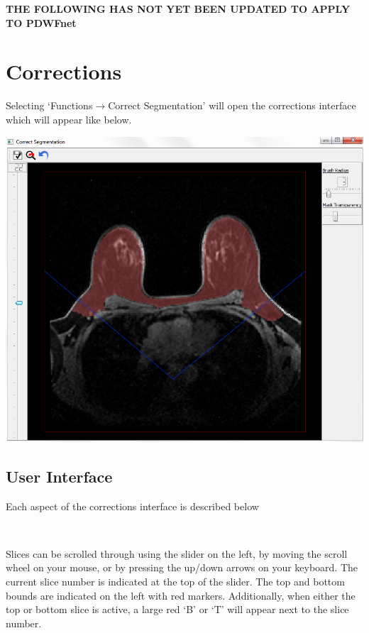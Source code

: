 \documentclass[twoside,a4paper]{refart}
\newcommand{\ra}{$\rightarrow$}
\begin{document}

\textbf{\LARGE{{THE FOLLOWING HAS NOT YET BEEN UPDATED TO APPLY TO PDWFnet}}}



\section{Corrections}
\label{Corrections}


Selecting `Functions\ra Correct Segmentation' will open the corrections interface which will appear like below.

\includegraphics[width=1\textwidth]{CorrectionsGUI}\\

\subsection{User Interface}

\hspace{-1.6in}
\begin{minipage}{1.35\textwidth}
\normalsize{Each aspect of the corrections interface is described below}
\end{minipage}\\[1em]

\normalsize

Slices can be scrolled through using the slider on the left, by moving the scroll wheel on your mouse, or by pressing the up/down arrows on your keyboard. The current slice number is indicated at the top of the slider. The top and bottom bounds are indicated on the left with red markers. Additionally, when either the top or bottom slice is active, a large red `B' or `T' will appear next to the slice number.
\end{document}
